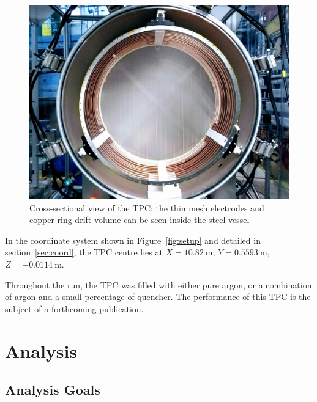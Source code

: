 \begin{figure}

  \centering
    \includegraphics[width=\linewidth]{files/Figures/IMG_20180830_170947192-3.jpg}
  \caption{Cross-sectional view of the TPC; the thin mesh electrodes and copper ring drift volume can be seen inside the steel vessel}
  
   \label{fig:TPC}
\end{figure}


In the coordinate system shown in Figure~\ref{fig:setup} and detailed in section~\ref{sec:coord}, the TPC centre lies at $X=10.82~\text{m}$, $Y=0.5593~\text{m}$, $Z=-0.0114~\text{m}$. 

Throughout the run, the TPC was filled with either pure argon, or a combination of argon and a small percentage of quencher. 
The performance of this TPC is the subject of a forthcoming publication.

\section{Analysis}
\label{hptpcPaper:sec:Analysis}
\subsection{Analysis Goals}

